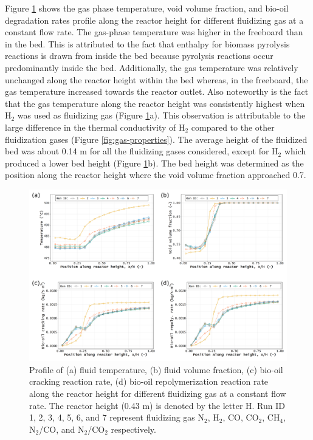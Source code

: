 Figure \ref{fig:cfd-temp-void-biooil} shows the gas phase temperature, void volume fraction, and bio-oil degradation rates profile along the reactor height for different fluidizing gas at a constant flow rate. The gas-phase temperature was higher in the freeboard than in the bed. This is attributed to the fact that enthalpy for biomass pyrolysis reactions is drawn from inside the bed because pyrolysis reactions occur predominantly inside the bed. Additionally, the gas temperature was relatively unchanged along the reactor height within the bed whereas, in the freeboard, the gas temperature increased towards the reactor outlet. Also noteworthy is the fact that the gas temperature along the reactor height was consistently highest when H$_2$ was used as fluidizing gas (Figure \ref{fig:cfd-temp-void-biooil}a). This observation is attributable to the large difference in the thermal conductivity of H$_2$ compared to the other fluidization gases (Figure \ref{fig:gas-properties}). The average height of the fluidized bed was about 0.14 m for all the fluidizing gases considered, except for H$_2$ which produced a lower bed height (Figure \ref{fig:cfd-temp-void-biooil}b). The bed height was determined as the position along the reactor height where the void volume fraction approached 0.7.

\begin{figure}[H]
    \centering
    \includegraphics[width=\textwidth]{figures/cfd-temp-void-biooil.pdf}
    \caption{Profile of (a) fluid temperature, (b) fluid volume fraction, (c) bio-oil cracking reaction rate, (d) bio-oil repolymerization reaction rate along the reactor height for different fluidizing gas at a constant flow rate. The reactor height (0.43 m) is denoted by the letter H. Run ID 1, 2, 3, 4, 5, 6, and 7 represent fluidizing gas N$_2$, H$_2$, CO, CO$_2$, CH$_4$, N$_2$/CO, and N$_2$/CO$_2$ respectively.}
    \label{fig:cfd-temp-void-biooil}
\end{figure}

